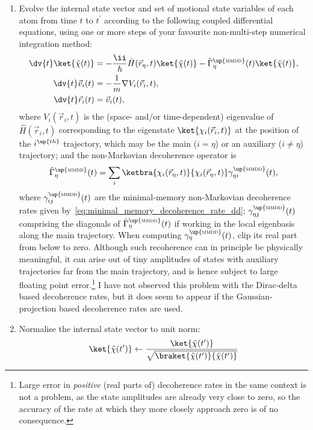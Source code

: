 \begin{enumerate}
    \item Evolve the internal state vector and set of motional state variables of each atom from time $t$ to $t^\prime$ according to the following coupled differential equations, using one or more steps of your favourite non-multi-step numerical integration method:
    \begin{align}
    \dv{t}\ket{\tilde\chi(t)} &= -\frac\ii\hbar \hat H(\vec r_\eta, t)\ket{\tilde\chi(t)} - \hat\Gamma^\up{\textsc{mmdd}}_\eta(t)\ket{\tilde\chi(t)},\\
    \dv{t}\vec v_i(t) &= -\frac1m\nabla V_i(\vec r_i, t),\\
    \dv{t}\vec r_i(t) &= \vec v_i(t),
    \end{align}
    where $V_i(\vec r_i, t)$ is the (space- and/or time-dependent) eigenvalue of $\hat H(\vec r_i, t)$ corresponding to the eigenstate $\ket{\chi_i(\vec r_i, t)}$ at the position of the $i^\up{th}$ trajectory, which may be the main ($i=\eta$) or an auxiliary ($i\neq\eta$) trajectory; and the non-Markovian decoherence operator is
    \begin{align}
    \hat\Gamma^\up{\textsc{mmdd}}_\eta(t) = \sum_i\ketbra{\chi_i(\vec r_\eta, t)}{\chi_i(\vec r_\eta, t)}\gamma^\up{\textsc{mmdd}}_{\eta i}(t),
    \end{align}
    where $\gamma^\up{\textsc{mmdd}}_{ij}(t)$ are the minimal-memory non-Markovian decoherence rates given by~\eqref{eq:minimal_memory_decoherence_rate_dd}; $\gamma^\up{\textsc{mmdd}}_{\eta j}(t)$ comprising the diagonals of $\hat\Gamma^\up{\textsc{mmdd}}_\eta(t)$ if working in the local eigenbasis along the main trajectory. When computing $\gamma^\up{\textsc{mmdd}}_\eta(t)$, clip its real part from below to zero. Although such recoherence can in principle be physically meaningful, it can arise out of tiny amplitudes of states with auxiliary trajectories far from the main trajectory, and is hence subject to large floating point error.\footnote{Large error in \emph{positive} (real parts of) decoherence rates in the same context is not a problem, as the state amplitudes are already very close to zero, so the accuracy of the rate at which they more closely approach zero is of no consequence.} I have not observed this problem with the Dirac-delta based decoherence rates, but it does seem to appear if the Gaussian-projection based decoherence rates are used.

    \item Normalise the internal state vector to unit norm:
    \begin{align}
    \ket{\tilde\chi(t^\prime)} \leftarrow \frac{\ket{\tilde\chi(t^\prime)}}
                               {\sqrt{\braket{\tilde\chi(t^\prime)}{\tilde\chi(t^\prime)}}}
    \end{align}


\end{enumerate}

